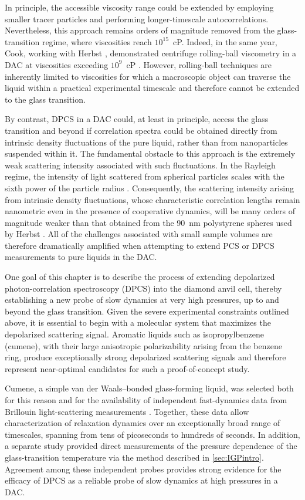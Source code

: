 In principle, the accessible viscosity range could be extended by employing smaller tracer particles and performing longer-timescale autocorrelations. Nevertheless, this approach remains orders of magnitude removed from the glass-transition regime, where viscosities reach $10^{15}$~cP. Indeed, in the same year, Cook, working with Herbst \etal, demonstrated centrifuge rolling-ball viscometry in a DAC at viscosities exceeding $10^{9}$~cP \nolinebreak\cite{Cook}. However, rolling-ball techniques are inherently limited to viscosities for which a macroscopic object can traverse the liquid within a practical experimental timescale and therefore cannot be extended to the glass transition.

By contrast, DPCS in a DAC could, at least in principle, access the glass transition and beyond if correlation spectra could be obtained directly from intrinsic density fluctuations of the pure liquid, rather than from nanoparticles suspended within it. The fundamental obstacle to this approach is the extremely weak scattering intensity associated with such fluctuations. In the Rayleigh regime, the intensity of light scattered from spherical particles scales with the sixth power of the particle radius \nolinebreak\cite{Sinclair}. Consequently, the scattering intensity arising from intrinsic density fluctuations, whose characteristic correlation lengths remain nanometric even in the presence of cooperative dynamics, will be many orders of magnitude weaker than that obtained from the 90~nm polystyrene spheres used by Herbst \etal. All of the challenges associated with small sample volumes are therefore dramatically amplified when attempting to extend PCS or DPCS measurements to pure liquids in the DAC.

One goal of this chapter is to describe the process of extending depolarized photon-correlation spectroscopy (DPCS) into the diamond anvil cell, thereby establishing a new probe of slow dynamics at very high pressures, up to and beyond the glass transition. Given the severe experimental constraints outlined above, it is essential to begin with a molecular system that maximizes the depolarized scattering signal. Aromatic liquids such as isopropylbenzene (cumene), with their large anisotropic polarizability arising from the benzene ring, produce exceptionally strong depolarized scattering signals and therefore represent near-optimal candidates for such a proof-of-concept study.

Cumene, a simple van der Waals–bonded glass-forming liquid, was selected both for this reason and for the availability of independent fast-dynamics data from Brillouin light-scattering measurements \cite{Li1995CumenePRL}. Together, these data allow characterization of relaxation dynamics over an exceptionally broad range of timescales, spanning from tens of picoseconds to hundreds of seconds. In addition, a separate study provided direct measurements of the pressure dependence of the glass-transition temperature via the \tgp method \cite{RansomPRL} described in \chap \ref{sec:IGPintro}. Agreement among these independent probes provides strong evidence for the efficacy of DPCS as a reliable probe of slow dynamics at high pressures in a DAC.

